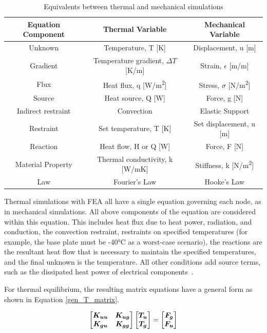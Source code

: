 \begin{table}[h]
\begin{center}
\begin{tabular}{ |c|c|c| }
 \hline
 \rowcolor{lightgray}
 Equation Component & Thermal Variable  & Mechanical Variable\\
  \hline
  Unknown & Temperature, T [K] & Displacement, u [m]\\
  \hline
 Gradient & Temperature gradient, $\Delta T$ [K/m] & Strain, $\epsilon$ [m/m]\\
 \hline
 Flux & Heat flux, q [W/m\textsuperscript{2}] & Stress, $\sigma$ [N/m\textsuperscript{2}]\\
 \hline
 Source & Heat source, Q [W] & Force, g [N]\\
 \hline
 Indirect restraint & Convection & Elastic Support \\
 \hline
 Restraint & Set temperature, T [K] & Set displacement, u [m]\\
 \hline
 Reaction & Heat flow, H or Q [W] & Force, F [N]\\
 \hline
 Material Property & Thermal conductivity, k [W/mK] & Stiffness, k [N/m\textsuperscript{2}]\\
 \hline
 Law & Fourier's Law & Hooke's Law\\
 \hline
\end{tabular}
\end{center}
\caption{Equivalents between thermal and mechanical simulations}
 \label{mech_to_thermal_properties}
\end{table}

Thermal simulations with FEA all have a single equation governing each node, as in mechanical simulations. All above components of the equation are considered within this equation. This includes heat flux due to heat power, radiation, and conduction, the convection restraint, restraints on specified temperatures (for example, the base plate must be -40°C as a worst-case scenario), the reactions are the resultant heat flow that is necessary to maintain the specified temperatures, and the final unknown is the temperature. All other conditions add source terms, such as the dissipated heat power of electrical components~\citep{FEA_SW}.

For thermal equilibrium, the resulting matrix equations have a general form as shown in Equation \ref{gen_T_matrix}.

\begin{equation} \label{gen_T_matrix}
\begingroup \boldmath
    \begin{bmatrix}
        K_{uu} & K_{ug} \\
        K_{gu} & K_{gg}
    \end{bmatrix}
    \begin{bmatrix}
        T_u \\
        T_g \\
    \end{bmatrix}
    =
    \begin{bmatrix}
        F_g \\
        F_u \\
    \end{bmatrix}
\endgroup
\end{equation}

